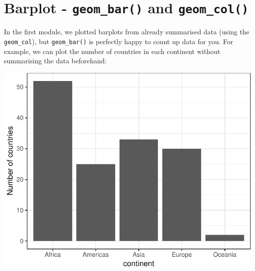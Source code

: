 \documentclass[12pt,]{krantz}
\makeatletter
\newenvironment{Shaded}{\begin{snugshade}}{\end{snugshade}}
\newcommand{\DataTypeTok}[1]{\textcolor[rgb]{0.13,0.29,0.53}{#1}}
\newcommand{\DecValTok}[1]{\textcolor[rgb]{0.00,0.00,0.81}{#1}}
\newcommand{\KeywordTok}[1]{\textcolor[rgb]{0.13,0.29,0.53}{\textbf{#1}}}
\newcommand{\NormalTok}[1]{#1}
\newcommand{\OperatorTok}[1]{\textcolor[rgb]{0.81,0.36,0.00}{\textbf{#1}}}
\newcommand{\StringTok}[1]{\textcolor[rgb]{0.31,0.60,0.02}{#1}}
\newenvironment{kframe}{%
\medskip{}
\setlength{\fboxsep}{.8em}
 \def\at@end@of@kframe{}%
 \ifinner\ifhmode%
  \def\at@end@of@kframe{\end{minipage}}%
  \begin{minipage}{\columnwidth}%
 \fi\fi%
 \def\FrameCommand##1{\hskip\@totalleftmargin \hskip-\fboxsep
 \colorbox{shadecolor}{##1}\hskip-\fboxsep
     \hskip-\linewidth \hskip-\@totalleftmargin \hskip\columnwidth}%
 \MakeFramed {\advance\hsize-\width
   \@totalleftmargin\z@ \linewidth\hsize
   \@setminipage}}%
 {\par\unskip\endMakeFramed%
 \at@end@of@kframe}
\renewenvironment{Shaded}{\begin{kframe}}{\end{kframe}}
\theoremstyle{definition}
\theoremstyle{definition}
\theoremstyle{definition}
\theoremstyle{remark}
\makeatother
\begin{document}
\hypertarget{barplot---geom_bar-and-geom_col}{%
\section{\texorpdfstring{Barplot - \texttt{geom\_bar()} and
\texttt{geom\_col()}}{Barplot - geom\_bar() and geom\_col()}}\label{barplot---geom_bar-and-geom_col}}

In the first module, we plotted barplots from already summarised data
(using the \texttt{geom\_col}), but \texttt{geom\_bar()} is perfectly
happy to count up data for you. For example, we can plot the number of
countries in each continent without summarising the data beforehand:

\begin{Shaded}
\end{Shaded}

\includegraphics{04_plotting_files/figure-latex/unnamed-chunk-14-1.pdf}
\end{document}
